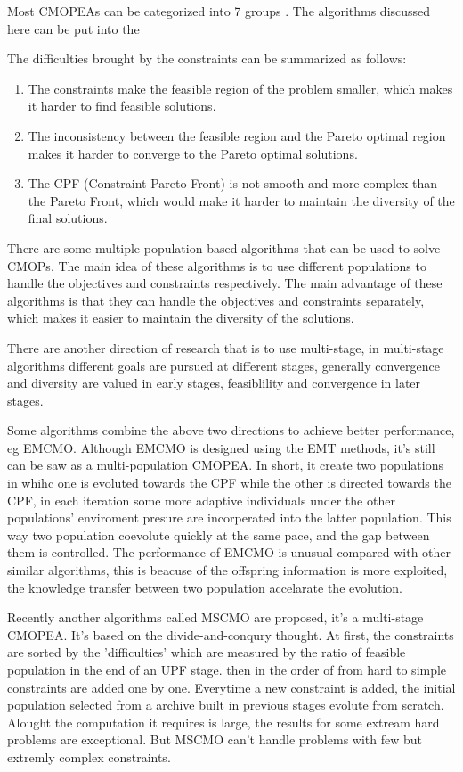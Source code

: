 \documentclass[sigconf]{acmart}
\begin{document}
Most CMOPEAs can be categorized into 7 groups \cite{survey_lj}. The algorithms discussed here can be put into the


The difficulties brought by the constraints can be summarized as follows:
\begin{enumerate}
  \item The constraints make the feasible region of the problem smaller, which makes it harder to find feasible solutions.
  \item The inconsistency between the feasible region and the Pareto optimal region makes it harder to converge to the Pareto optimal solutions.
  \item The CPF (Constraint Pareto Front) is not smooth and more complex than the Pareto Front, which would make it harder to maintain the diversity of the final solutions.
\end{enumerate}

There are some multiple-population based algorithms that can be used to solve CMOPs. The main idea of these algorithms is to use different populations to handle the objectives and constraints respectively. The main advantage of these algorithms is that they can handle the objectives and constraints separately, which makes it easier to maintain the diversity of the solutions.

There are another direction of research that is to use multi-stage, in multi-stage algorithms different goals are pursued at different stages, generally convergence and diversity are valued in early stages, feasiblility and convergence in later stages.

Some algorithms combine the above two directions to achieve better performance, eg EMCMO\cite{emcmo}. Although EMCMO is designed using the EMT\cite{emt} methods, it's still can be saw as a multi-population CMOPEA. In short, it create two populations in whihc one is evoluted towards the CPF while the other is directed towards the CPF, in each iteration some more adaptive individuals under the other populations' enviroment presure are incorperated into the latter population. This way two population coevolute quickly at the same pace, and the gap between them is controlled.  The performance of EMCMO is unusual compared with other similar algorithms, this is beacuse of the offspring information is more exploited, the knowledge transfer between two population accelarate the evolution.

Recently another algorithms called MSCMO\cite{mscmo} are proposed, it's a multi-stage CMOPEA. It's based on the divide-and-conqury thought. At first, the constraints are sorted by the 'difficulties' which are measured by the ratio of feasible population in the end of an UPF stage. then in the order of from hard to simple constraints are added one by one. Everytime a new constraint is added, the initial population selected from a archive built in previous stages evolute from scratch.
Alought the computation it requires is large, the results for some extream hard problems are exceptional. But MSCMO can't handle problems with few but extremly complex constraints.
\end{document}
